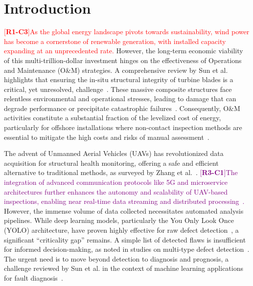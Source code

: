 \documentclass[energies,article,submit,pdftex,moreauthors]{Definitions/mdpi}
\newcommand{\revtag}[2]{[\textbf{R#1-C#2}]}
\newcommand{\Rone}[1]{\textcolor{red}{#1}}
\newcommand{\Rthree}[1]{\textcolor{purple}{#1}}
\begin{document}

\section{Introduction}\label{sec:intro}

\Rone{\revtag{1}{3}As the global energy landscape pivots towards sustainability, wind power has become a cornerstone of renewable generation, with installed capacity expanding at an unprecedented rate.} However, the long-term economic viability of this multi-trillion-dollar investment hinges on the effectiveness of Operations and Maintenance (O\&M) strategies. A comprehensive review by Sun et al. highlights that ensuring the in-situ structural integrity of turbine blades is a critical, yet unresolved, challenge~\cite{Sun2022InSitu}. These massive composite structures face relentless environmental and operational stresses, leading to damage that can degrade performance or precipitate catastrophic failures~\cite{Kong2023Progress}. Consequently, O\&M activities constitute a substantial fraction of the levelized cost of energy, particularly for offshore installations where non-contact inspection methods are essential to mitigate the high costs and risks of manual assessment~\cite{Aminzadeh2023NonContact}.

The advent of Unmanned Aerial Vehicles (UAVs) has revolutionized data acquisition for structural health monitoring, offering a safe and efficient alternative to traditional methods, as surveyed by Zhang et al.~\cite{Zhang2024Uav}. \Rthree{\revtag{3}{1}The integration of advanced communication protocols like 5G and microservice architectures further enhances the autonomy and scalability of UAV-based inspections, enabling near real-time data streaming and distributed processing~\cite{Banafaa2024Comprehensive}.} However, the immense volume of data collected necessitates automated analysis pipelines. While deep learning models, particularly the You Only Look Once (YOLO) architecture, have proven highly effective for raw defect detection~\cite{Yan2022Yolov4, Dai2024Image}, a significant ``criticality gap'' remains. A simple list of detected flaws is insufficient for informed decision-making, as noted in studies on multi-type defect detection~\cite{Mao2021Automatic}. The urgent need is to move beyond detection to diagnosis and prognosis, a challenge reviewed by Sun et al. in the context of machine learning applications for fault diagnosis~\cite{Sun2021Fault}.
\end{document}
